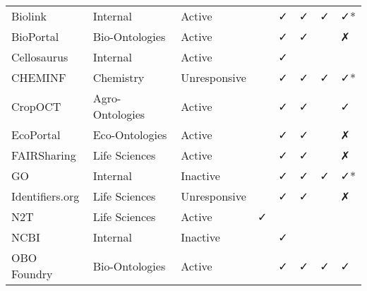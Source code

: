 \begin{table}
\begin{tabular}{llllllll}
        Biolink &        Internal &       Active &                           &                      ✓ &                              ✓ &                           ✓ &                     ✓* \\
      BioPortal &  Bio-Ontologies &       Active &                           &                      ✓ &                              ✓ &                             &                      ✗ \\
    Cellosaurus &        Internal &       Active &                           &                      ✓ &                                &                             &                        \\
        CHEMINF &       Chemistry & Unresponsive &                           &                      ✓ &                              ✓ &                           ✓ &                     ✓* \\
        CropOCT & Agro-Ontologies &       Active &                           &                      ✓ &                              ✓ &                             &                      ✓ \\
      EcoPortal &  Eco-Ontologies &       Active &                           &                      ✓ &                              ✓ &                             &                      ✗ \\
    FAIRSharing &   Life Sciences &       Active &                           &                      ✓ &                              ✓ &                             &                      ✗ \\
             GO &        Internal &     Inactive &                           &                      ✓ &                              ✓ &                           ✓ &                     ✓* \\
Identifiers.org &   Life Sciences & Unresponsive &                           &                      ✓ &                              ✓ &                             &                      ✗ \\
            N2T &   Life Sciences &       Active &                         ✓ &                        &                                &                             &                        \\
           NCBI &        Internal &     Inactive &                           &                      ✓ &                                &                             &                        \\
    OBO Foundry &  Bio-Ontologies &       Active &                           &                      ✓ &                              ✓ &                           ✓ &                      ✓ \\

\end{tabular}
\end{table}
